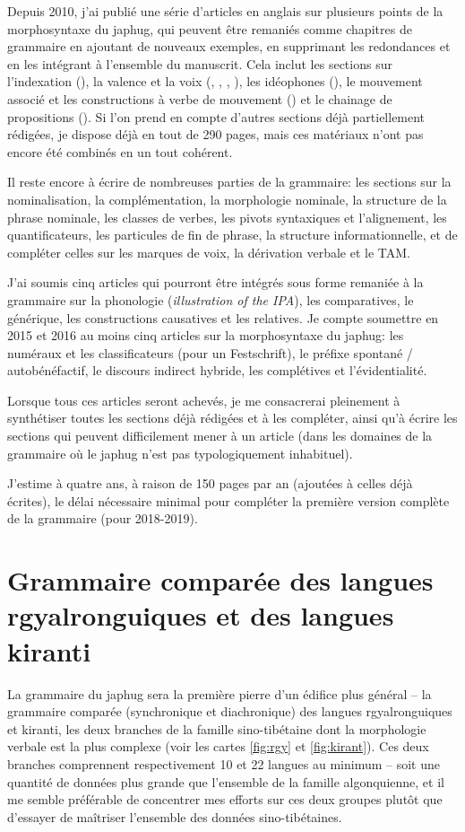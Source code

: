 \documentclass[oldfontcommands,oneside,a4paper,11pt]{article}
\begin{document}
Depuis 2010, j'ai publié une série d'articles en anglais sur plusieurs points de la morphosyntaxe du japhug, qui peuvent être remaniés comme chapitres de grammaire en ajoutant de nouveaux exemples, en supprimant les redondances et en les intégrant à l'ensemble du manuscrit. Cela inclut les sections sur l'indexation (\citealt{jacques10inverse}), la valence et la voix (\citealt{jacques12demotion}, \citealt{jacques12incorp}, \citealt{jacques13tropative},   \citealt{jacques14antipassive}), les idéophones (\citealt{japhug14ideophones}), le mouvement associé et les constructions à verbe de mouvement (\citealt{jacques13harmonization}) et le chainage de propositions (\citealt{jacques14linking}). Si l'on prend en compte d'autres sections déjà partiellement rédigées, je dispose déjà en tout de 290 pages, mais ces matériaux n'ont pas encore été combinés en un  tout cohérent.

Il reste encore à écrire de nombreuses parties de la grammaire: les sections sur la nominalisation, la complémentation, la morphologie nominale, la structure de la phrase nominale, les classes de verbes, les pivots syntaxiques et l'alignement, les quantificateurs, les particules de fin de phrase, la structure informationnelle, et de compléter celles sur les marques de voix, la dérivation verbale et le TAM.

  J'ai soumis cinq articles qui pourront être intégrés sous forme remaniée à la grammaire sur la phonologie (\textit{illustration of the IPA}), les comparatives, le générique, les constructions causatives et les relatives. Je compte soumettre en 2015 et 2016 au moins cinq articles sur la morphosyntaxe du japhug: les numéraux et les classificateurs (pour un Festschrift), le préfixe spontané / autobénéfactif, le discours indirect hybride, les complétives et l'évidentialité. 
  
  Lorsque tous ces articles seront achevés, je me consacrerai pleinement  à synthétiser toutes les sections déjà rédigées et à les compléter, ainsi qu'à écrire les sections qui peuvent difficilement mener à un article (dans les domaines de la grammaire où le japhug n'est pas typologiquement inhabituel).

J'estime à quatre ans, à raison de 150 pages par an (ajoutées à celles déjà écrites), le délai nécessaire minimal pour compléter la première version complète de la grammaire (pour 2018-2019).

\section{Grammaire comparée des langues rgyalronguiques et des langues kiranti}
La grammaire du japhug sera la première pierre d'un édifice plus général -- la grammaire comparée (synchronique et diachronique) des langues rgyalronguiques et kiranti, les deux branches de la famille sino-tibétaine dont la morphologie verbale est la plus complexe (voir les cartes  \ref{fig:rgy}  et \ref{fig:kirant}). Ces deux branches comprennent respectivement 10 et 22 langues au minimum -- soit une quantité de données plus grande que l'ensemble de la famille algonquienne, et il me semble préférable de concentrer mes efforts sur ces deux groupes plutôt que d'essayer de maîtriser l'ensemble des données sino-tibétaines.
\end{document}
